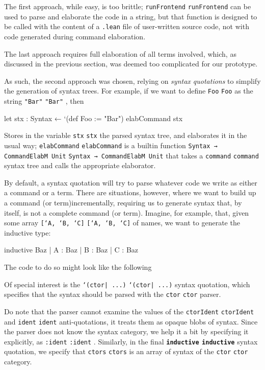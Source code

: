 \documentclass[titlepage]{report}
\newcommand\lean[1]{%
\ifx\leanmode\undefined%
\def\leanmode{1}%
\texttt{\small #1}%
\undef\leanmode%
\else%
\texttt{#1}%
\fi%
}
\newcommand\keyword[1]{{\color{keywordcolor} \textbf{\lean{#1}}}}
\newcommand\inductive{{\keyword{inductive}}}
\begin{document}
The first approach, while easy, is too brittle; \lean{runFrontend} can be used to parse and elaborate the code in a string, but that function is designed to be called with the content of a \texttt{.lean} file of user-written source code, not with code generated during command elaboration.

The last approach requires full elaboration of all terms involved, which, as discussed in the previous section, was deemed too complicated for our prototype.

As such, the second approach was chosen, relying on \emph{syntax quotations} to simplify the generation of syntax trees. 
For example, if we want to define \lean{Foo} as the string \lean{"Bar"}, then
\begin{leancode}
    let stx : Syntax ← `(def Foo := "Bar")
    elabCommand stx
\end{leancode}
Stores in the variable \lean{stx} the parsed syntax tree, and elaborates it in the usual way; \lean{elabCommand} is a builtin function \lean{Syntax → CommandElabM Unit} that takes a \lean{command} syntax tree and calls the appropriate elaborator.

By default, a syntax quotation will try to parse whatever code we write as either a command or a term. There are situations, however, where we want to build up a command (or term)incrementally, requiring us to generate syntax that, by itself, is not a complete command (or term). Imagine, for example, that, given some array \lean{[`A, `B, `C]} of names, we want to generate the inductive type:
\begin{leancode}
    inductive Baz
      | A : Baz
      | B : Baz
      | C : Baz
\end{leancode}
The code to do so might look like the following
Of special interest is the \lean{`(ctor| ...)} syntax quotation, which specifies that the syntax should be parsed with the \lean{ctor} parser.

Do note that the parser cannot examine the values of the \lean{ctorIdent} and \lean{ident} anti-quotations, it treats them as opaque blobs of syntax. Since the parser does not know the syntax category, we help it a bit by specifying it explicitly, as \lean{:ident}.
Similarly, in the final \inductive{} syntax quotation, we specify that \lean{ctors} is an array of syntax of the \lean{ctor} category.
\end{document}
